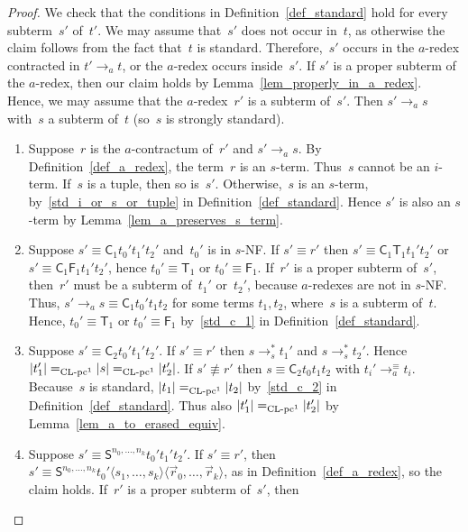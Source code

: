 \documentclass[a4paper,UKenglish]{lipics-v2016}
\newcommand{\Cs}{\mathsf{C}}
\newcommand{\Fs}{\mathsf{F}}
\newcommand{\Ts}{\mathsf{T}}
\newcommand{\Ss}{\mathsf{S}}
\newcommand{\erase}[1]{\ensuremath{|#1|}}
\newcommand{\la}{\ensuremath{\langle}}
\newcommand{\ra}{\ensuremath{\rangle}}
\newcommand{\sCLC}{{\ensuremath{\text{\rm CL-pc}^1}}}
\begin{document}
\begin{proof}
  We check that the conditions in Definition~\ref{def_standard} hold
  for every subterm~$s'$ of~$t'$. We may assume that~$s'$ does not
  occur in~$t$, as otherwise the claim follows from the fact that~$t$
  is standard. Therefore,~$s'$ occurs in the $a$-redex contracted in
  $t' \to_a t$, or the $a$-redex occurs inside~$s'$. If $s'$ is a
  proper subterm of the $a$-redex, then our claim holds by
  Lemma~\ref{lem_properly_in_a_redex}. Hence, we may assume that the
  $a$-redex~$r'$ is a subterm of~$s'$. Then $s' \to_a s$ with~$s$ a
  subterm of~$t$ (so~$s$ is strongly standard).
  \begin{enumerate}
  \item Suppose~$r$ is the $a$-contractum of~$r'$ and $s' \to_a
    s$. By Definition~\ref{def_a_redex}, the term~$r$ is an
    $s$-term. Thus~$s$ cannot be an $i$-term. If~$s$ is a tuple, then
    so is~$s'$. Otherwise,~$s$ is an $s$-term,
    by~\ref{std_i_or_s_or_tuple} in
    Definition~\ref{def_standard}. Hence $s'$ is also an $s$-term by
    Lemma~\ref{lem_a_preserves_s_term}.
  \item Suppose $s' \equiv \Cs_1 t_0' t_1' t_2'$ and~$t_0'$ is in
    $s$-NF. If $s' \equiv r'$ then $s' \equiv \Cs_1 \Ts_1 t_1' t_2'$
    or $s' \equiv \Cs_1 \Fs_1 t_1' t_2'$, hence $t_0' \equiv \Ts_1$ or
    $t_0' \equiv \Fs_1$. If~$r'$ is a proper subterm of~$s'$,
    then~$r'$ must be a subterm of~$t_1'$ or~$t_2'$, because
    $a$-redexes are not in $s$-NF. Thus,
    $s' \to_a s \equiv \Cs_1 t_0' t_1 t_2$ for some terms $t_1,t_2$,
    where~$s$ is a subterm of~$t$. Hence, $t_0' \equiv \Ts_1$ or
    $t_0' \equiv \Fs_1$ by~\ref{std_c_1} in
    Definition~\ref{def_standard}.
  \item Suppose $s' \equiv \Cs_2 t_0' t_1' t_2'$. If $s' \equiv r'$
    then $s \to_s^{*} t_1'$ and $s \to_s^{*} t_2'$. Hence
    $\erase{t_1'} =_\sCLC \erase{s} =_\sCLC \erase{t_2'}$. If
    $s' \not\equiv r'$ then $s \equiv \Cs_2 t_0 t_1 t_2$ with
    $t_i' \to_a^{\equiv} t_i$. Because~$s$ is standard,
    $\erase{t_1} =_\sCLC \erase{t_2}$ by~\ref{std_c_2} in
    Definition~\ref{def_standard}. Thus also
    $\erase{t_1'} =_\sCLC \erase{t_2'}$ by
    Lemma~\ref{lem_a_to_erased_equiv}.
  \item Suppose $s' \equiv \Ss^{n_0,\ldots,n_k} t_0' t_1' t_2'$. If
    $s' \equiv r'$, then
    $s' \equiv \Ss^{n_0,\ldots,n_k} t_0' \la s_1,\ldots,s_{k} \ra \la
    \vec{r}_0,\ldots,\vec{r}_k\ra$, as in
    Definition~\ref{def_a_redex}, so the claim holds. If~$r'$ is a
    proper subterm of~$s'$, then

\end{enumerate}
\end{proof}
\end{document}
